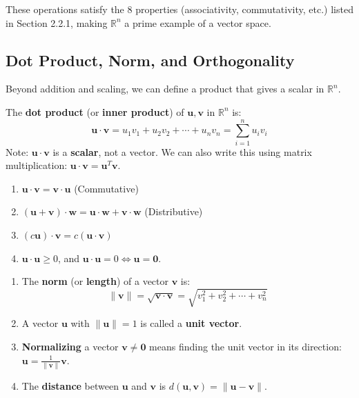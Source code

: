 \documentclass[oneside]{book}
\begin{document}
These operations satisfy the 8 properties (associativity, commutativity, etc.) listed in Section 2.2.1, making $\mathbb{R}^n$ a prime example of a vector space.

\subsection{Dot Product, Norm, and Orthogonality}

Beyond addition and scaling, we can define a product that gives a scalar in $\mathbb{R}^n$.

\begin{definition}
The \textbf{dot product} (or \textbf{inner product}) of $\mathbf{u}, \mathbf{v}$ in $\mathbb{R}^n$ is:
\[ \mathbf{u} \cdot \mathbf{v} = u_1v_1 + u_2v_2 + \cdots + u_nv_n = \sum_{i=1}^n u_i v_i \]
Note: $\mathbf{u} \cdot \mathbf{v}$ is a \textbf{scalar}, not a vector.
We can also write this using matrix multiplication: $\mathbf{u} \cdot \mathbf{v} = \mathbf{u}^T \mathbf{v}$.
\end{definition}

\begin{property}
\begin{enumerate}
    \item $\mathbf{u} \cdot \mathbf{v} = \mathbf{v} \cdot \mathbf{u}$ (Commutative)
    \item $(\mathbf{u} + \mathbf{v}) \cdot \mathbf{w} = \mathbf{u} \cdot \mathbf{w} + \mathbf{v} \cdot \mathbf{w}$ (Distributive)
    \item $(c\mathbf{u}) \cdot \mathbf{v} = c(\mathbf{u} \cdot \mathbf{v})$
    \item $\mathbf{u} \cdot \mathbf{u} \ge 0$, and $\mathbf{u} \cdot \mathbf{u} = 0 \iff \mathbf{u} = \mathbf{0}$.
\end{enumerate}
\end{property}

\begin{definition}
\begin{enumerate}
    \item The \textbf{norm} (or \textbf{length}) of a vector $\mathbf{v}$ is:
    \[ \|\mathbf{v}\| = \sqrt{\mathbf{v} \cdot \mathbf{v}} = \sqrt{v_1^2 + v_2^2 + \cdots + v_n^2} \]
    \item A vector $\mathbf{u}$ with $\|\mathbf{u}\| = 1$ is called a \textbf{unit vector}.
    \item \textbf{Normalizing} a vector $\mathbf{v} \neq \mathbf{0}$ means finding the unit vector in its direction: $\mathbf{u} = \frac{1}{\|\mathbf{v}\|} \mathbf{v}$.
    \item The \textbf{distance} between $\mathbf{u}$ and $\mathbf{v}$ is $d(\mathbf{u}, \mathbf{v}) = \|\mathbf{u} - \mathbf{v}\|$.
\end{enumerate}
\end{definition}
\end{document}
